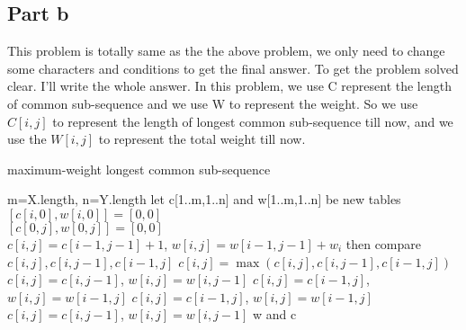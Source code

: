 \documentclass[paper=a4, fontsize=11pt]{scrartcl} %
\numberwithin{equation}{section} %
\numberwithin{figure}{section} %
\numberwithin{table}{section} %
\begin{document}
\subsection{\textbf{Part b}}
This problem is totally same as the the above problem, we only need to change some characters and conditions to get the final answer. To get the problem solved clear. I'll write the whole answer.
In this problem, we use C represent the length of common sub-sequence and we use W to represent the weight. So we use $C[i,j]$ to represent the length of longest common sub-sequence till now, and we use the $W[i,j]$ to represent the total weight till now.\\
\begin{algorithm}
  \caption{maximum-weight longest common sub-sequence}
  \begin{algorithmic}
  \STATE m=X.length, n=Y.length
  \STATE let c[1..m,1..n] and w[1..m,1..n] be new tables
  \STATE $[c[i,0],w[i,0]]=[0,0]$\\
  \ENDFOR
  \STATE $[c[0,j],w[0,j]]=[0,0]$\\
  \ENDFOR
        \STATE $c[i,j]=c[i-1,j-1]+1$, $w[i,j]=w[i-1,j-1]+w_i$
        \STATE then compare $c[i,j],c[i,j-1],c[i-1,j]$
        \STATE $c[i,j]=\max{(c[i,j],c[i,j-1],c[i-1,j])}$
        \STATE $c[i,j]=c[i,j-1]$, $w[i,j]=w[i,j-1]$
        \STATE $c[i,j]=c[i-1,j]$, $w[i,j]=w[i-1,j]$
            \STATE $c[i,j]=c[i-1,j]$, $w[i,j]=w[i-1,j]$
         \ELSE
            \STATE $c[i,j]=c[i,j-1]$, $w[i,j]=w[i,j-1]$
         \ENDIF
    \ENDIF
    \ENDFOR
  \ENDFOR
  \RETURN w and c
  \end{algorithmic}
\end{algorithm}
\end{document}
